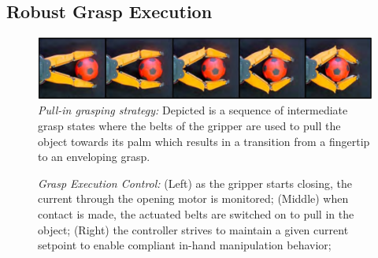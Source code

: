 \subsection{Robust Grasp Execution}
\label{subsec:grasp_execution}
%
\begin{figure}[!t]
 \centering
   \includegraphics[width = 1.0\linewidth]{figs/pull_in}
   \caption{\textit{Pull-in grasping strategy:} Depicted is a sequence of intermediate grasp states
     where the belts of the gripper are used to pull the object towards its palm which results in a
     transition from a fingertip to an enveloping grasp.}
   \vspace{-4mm}
   \label{fig:pull_in}
   \centering
 \end{figure}
 \begin{figure}[!t]
   \centering
   \caption{\textit{Grasp Execution Control:} (Left) as the gripper starts closing, the current
     through the opening motor is monitored; (Middle) when contact is made, the actuated belts are
     switched on to pull in the object; (Right) the controller strives to maintain a given current
     setpoint to enable compliant in-hand manipulation behavior;}
   \label{fig:pull_in_control}
   \centering
   \vspace{-0.5cm}
 \end{figure}
